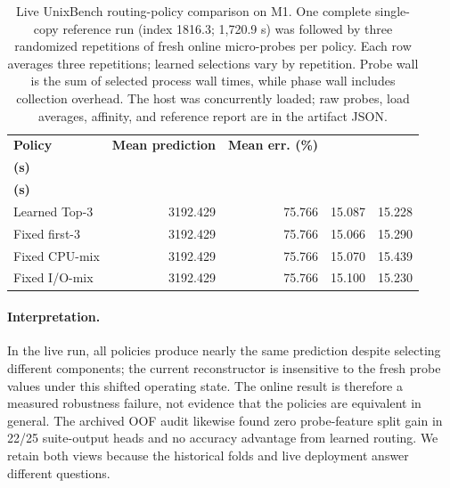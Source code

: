 \documentclass[sigconf, review, anonymous, balance=false]{acmart}
\begin{document}
\begin{table}[t]
\centering
\caption{Live UnixBench routing-policy comparison on M1. One complete single-copy reference run (index 1816.3; 1,720.9 s) was followed by three randomized repetitions of fresh online micro-probes per policy. Each row averages three repetitions; learned selections vary by repetition. Probe wall is the sum of selected process wall times, while phase wall includes collection overhead. The host was concurrently loaded; raw probes, load averages, affinity, and reference report are in the artifact JSON.}
\label{tab:matched-routing}
\scriptsize
\setlength{\tabcolsep}{3pt}
\begin{tabular}{lrrrr}
\toprule
\textbf{Policy} & \textbf{Mean prediction} & \textbf{Mean err. (\%)} & \shortstack{\textbf{Probe wall}\\\textbf{(s)}} & \shortstack{\textbf{Probe phase}\\\textbf{(s)}} \\
\midrule
Learned Top-$3$ & 3192.429 & 75.766 & 15.087 & 15.228 \\
Fixed first-$3$ & 3192.429 & 75.766 & 15.066 & 15.290 \\
Fixed CPU-mix & 3192.429 & 75.766 & 15.070 & 15.439 \\
Fixed I/O-mix & 3192.429 & 75.766 & 15.100 & 15.230 \\
\bottomrule
\end{tabular}
\end{table}

\paragraph{Interpretation.} In the live run, all policies produce nearly the same prediction despite selecting different components; the current reconstructor is insensitive to the fresh probe values under this shifted operating state. The online result is therefore a measured robustness failure, not evidence that the policies are equivalent in general. The archived OOF audit likewise found zero probe-feature split gain in 22/25 suite-output heads and no accuracy advantage from learned routing. We retain both views because the historical folds and live deployment answer different questions.
\end{document}

